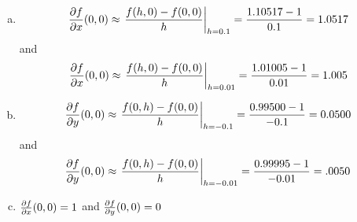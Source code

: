 \begin{answer}
\begin{enumerate}[(a)]
\item
\begin{align*}
\pdiff{f}{x}(0,0)
\approx \left.\frac{f(h,0)-f(0,0)}{h}\right|_{h=0.1}
=\frac{1.10517-1}{0.1}
=1.0517
\end{align*}
and
\begin{align*}
\pdiff{f}{x}(0,0)
\approx \left.\frac{f(h,0)-f(0,0)}{h}\right|_{h=0.01}
=\frac{1.01005-1}{0.01}
=1.005
\end{align*}
\item
\begin{align*}
\pdiff{f}{y}(0,0)
\approx \left.\frac{f(0,h)-f(0,0)}{h}\right|_{h=-0.1}
=\frac{0.99500-1}{-0.1}
=0.0500
\end{align*}
and
\begin{align*}
\pdiff{f}{y}(0,0)
\approx \left.\frac{f(0,h)-f(0,0)}{h}\right|_{h=-0.01}
=\frac{0.99995-1}{-0.01}
=.0050
\end{align*}
\item
$
\pdiff{f}{x}(0,0) =1 
$
and
$\pdiff{f}{y}(0,0) = 0
$
\end{enumerate}
\end{answer}

